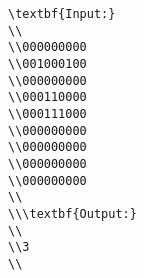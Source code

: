 \begin{verbatim}
\textbf{Input:}
\\
\\000000000 
\\001000100 
\\000000000 
\\000110000 
\\000111000 
\\000000000 
\\000000000 
\\000000000 
\\000000000 
\\
\\\textbf{Output:}
\\
\\3
\\\end{verbatim}